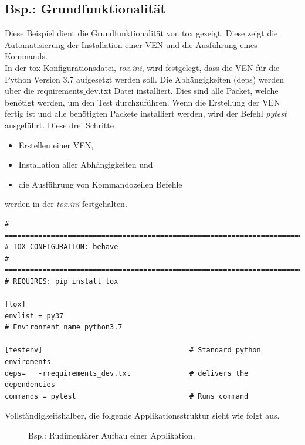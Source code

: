 \subsection{Bsp.: Grundfunktionalität}
Diese Beispiel dient die Grundfunktionalität von tox gezeigt. Diese zeigt die Automatisierung der Installation einer \gls{VEN} und die Ausführung eines Kommands.\\

In der tox Konfigurationsdatei, \textit{tox.ini}, wird festgelegt, dass die \gls{VEN} für die Python Version 3.7 aufgesetzt werden soll. Die Abhängigkeiten (deps) werden über die requirements$\_$dev.txt Datei installiert. Dies sind alle Packet, welche benötigt werden, um den Test durchzuführen. Wenn die Erstellung der \gls{VEN} fertig ist und alle benötigten Packete installiert werden, wird der Befehl \textit{pytest} ausgeführt. Diese drei Schritte
\begin{itemize}
	\item Erstellen einer \gls{VEN},
	\item Installation aller Abhängigkeiten und 
	\item die Ausführung von Kommandozeilen Befehle
\end{itemize}
werden in der \textit{tox.ini} festgehalten.

\begin{lstlisting}[style=Config]
# ============================================================================
# TOX CONFIGURATION: behave
# ============================================================================
# REQUIRES: pip install tox

[tox]
envlist = py37
# Environment name python3.7

[testenv] 									# Standard python enviroments
deps=	-rrequirements_dev.txt 				# delivers the dependencies
commands = pytest							# Runs command
\end{lstlisting}


Vollständigkeitshalber, die folgende Applikationsstruktur sieht wie folgt aus.
\begin{figure}[h]
	\centering
	\caption{Bsp.: Rudimentärer Aufbau einer Applikation.}
\end{figure}

